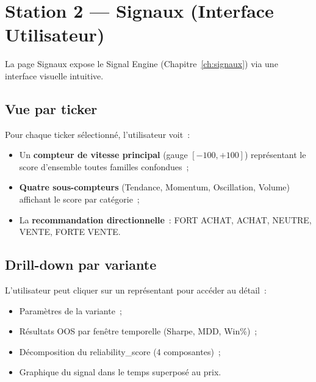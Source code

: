 \section{Station 2 --- Signaux (Interface Utilisateur)}
\label{sec:station_signaux}

La page Signaux expose le Signal Engine (Chapitre~\ref{ch:signaux}) via une interface
visuelle intuitive.

\subsection{Vue par ticker}

Pour chaque ticker sélectionné, l'utilisateur voit~:

\begin{itemize}
    \item Un \textbf{compteur de vitesse principal} (gauge $[-100, +100]$) représentant
    le score d'ensemble toutes familles confondues~;
    \item \textbf{Quatre sous-compteurs} (Tendance, Momentum, Oscillation, Volume)
    affichant le score par catégorie~;
    \item La \textbf{recommandation directionnelle}~: FORT ACHAT, ACHAT, NEUTRE,
    VENTE, FORTE VENTE.
\end{itemize}


\subsection{Drill-down par variante}

L'utilisateur peut cliquer sur un représentant pour accéder au détail~:
\begin{itemize}
    \item Paramètres de la variante~;
    \item Résultats OOS par fenêtre temporelle (Sharpe, MDD, Win\%)~;
    \item Décomposition du reliability\_score (4 composantes)~;
    \item Graphique du signal dans le temps superposé au prix.
\end{itemize}



